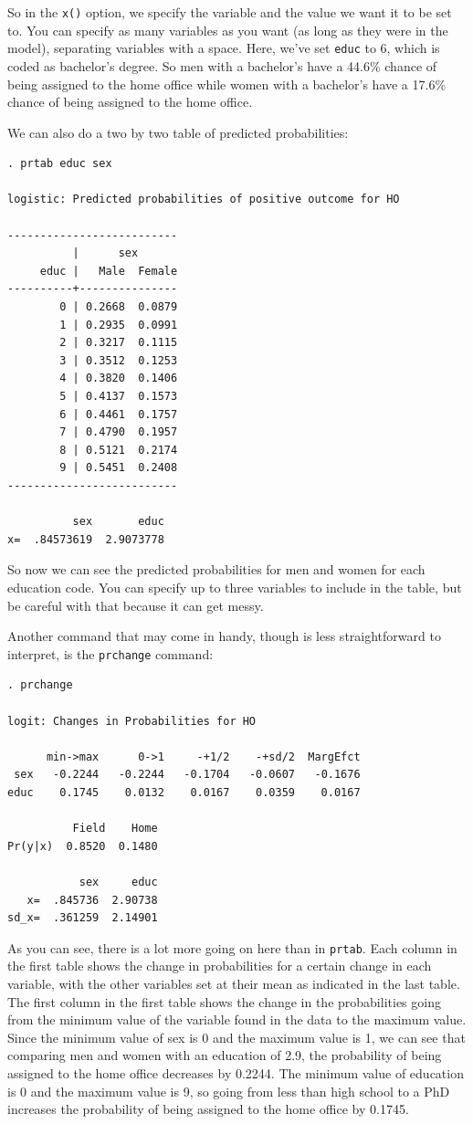 \documentclass[12pt]{amsart}
\begin{document}
So in the \texttt{x()} option, we specify the variable and the value we want it to be set to. You can specify as many variables as you want (as long as they were in the model), separating variables with a space. Here, we've set \texttt{educ} to 6, which is coded as bachelor's degree. So men with a bachelor's have a 44.6\% chance of being assigned to the home office while women with a bachelor's have a 17.6\% chance of being assigned to the home office.


We can also do a two by two table of predicted probabilities:

\begin{verbatim}
. prtab educ sex

logistic: Predicted probabilities of positive outcome for HO

--------------------------
          |      sex      
     educ |   Male  Female
----------+---------------
        0 | 0.2668  0.0879
        1 | 0.2935  0.0991
        2 | 0.3217  0.1115
        3 | 0.3512  0.1253
        4 | 0.3820  0.1406
        5 | 0.4137  0.1573
        6 | 0.4461  0.1757
        7 | 0.4790  0.1957
        8 | 0.5121  0.2174
        9 | 0.5451  0.2408
--------------------------

          sex       educ
x=  .84573619  2.9073778
\end{verbatim}

So now we can see the predicted probabilities for men and women for each education code. You can specify up to three variables to include in the table, but be careful with that because it can get messy. 

Another command that may come in handy, though is less straightforward to interpret, is the \texttt{prchange} command:

\begin{verbatim}
. prchange

logit: Changes in Probabilities for HO

      min->max      0->1     -+1/2    -+sd/2  MargEfct
 sex   -0.2244   -0.2244   -0.1704   -0.0607   -0.1676
educ    0.1745    0.0132    0.0167    0.0359    0.0167

          Field    Home
Pr(y|x)  0.8520  0.1480

           sex     educ
   x=  .845736  2.90738
sd_x=  .361259  2.14901
\end{verbatim}

As you can see, there is a lot more going on here than in \texttt{prtab}. Each column in the first table shows the change in probabilities for a certain change in each variable, with the other variables set at their mean as indicated in the last table. The first column in the first table shows the change in the probabilities going from the minimum value of the variable found in the data to the maximum value. Since the minimum value of sex is 0 and the maximum value is 1, we can see that comparing men and women with an education of 2.9, the probability of being assigned to the home office decreases by 0.2244. The minimum value of education is 0 and the maximum value is 9, so going from less than high school to a PhD increases the probability of being assigned to the home office by 0.1745. 
\end{document}

